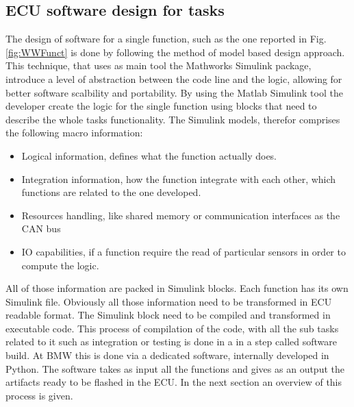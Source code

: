 \documentclass[../main.tex]{subfiles}
\begin{document}
\subsection{\gls{ECU} software design for tasks}
The design of software for a single function, such as the one reported in Fig.\ref{fig:WWFunct} is done by following the method of model based design approach. This technique, that uses as main tool the Mathworks Simulink package, introduce a level of abstraction between the code line and the logic, allowing for better software scalbility and portability. By using the Matlab Simulink tool the developer create the logic for the single function using blocks that need to describe the whole tasks functionality. The Simulink models, therefor comprises the following macro information:
\begin{itemize}
    \item Logical information, defines what the function actually does. 
    \item Integration information, how the function integrate with each other, which functions are related to the one developed. 
    \item Resources handling, like shared memory or communication interfaces as  the CAN bus
    \item IO capabilities, if a function require the read of particular sensors in order to compute the logic. 
\end{itemize}
All of those information are packed in Simulink blocks. Each function has its own Simulink file. Obviously all those information need to be transformed in \gls{ECU} readable format. The Simulink block need to be compiled and transformed in executable code. This process of compilation of the code, with all the sub tasks related to it such as integration or testing is done in a in a step called software build. 
At \gls{BMW} this is done via a dedicated software, internally developed in Python. The software takes as input all the functions and gives as an output the artifacts ready to be flashed in the \gls{ECU}. In the next section an overview of this process is given.
\end{document}
